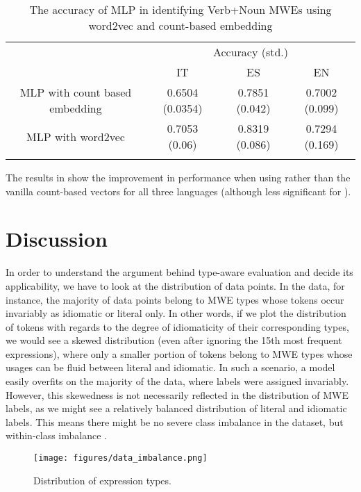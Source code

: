 \documentclass[output=paper,modfonts,nonflat]{langsci/langscibook}
\begin{document}
\begin{table}[!ht]
\small
\caption{The accuracy of MLP in identifying Verb+Noun MWEs using word2vec and count-based embedding}
\label{tab:wv}
 \begin{tabular}{cccc}
  \lsptoprule
  & \multicolumn{3}{c}{Accuracy (std.)} \\
  & IT & ES & EN \\
  \midrule
  MLP with count based embedding & 0.6504 (0.0354) & 0.7851 (0.042)  & 0.7002 (0.099) \\
  MLP with word2vec & 0.7053 (0.06) &   0.8319 (0.086) & 0.7294 (0.169) \\
  \lspbottomrule
 \end{tabular}
\end{table}

The results in  show the improvement in performance when using  rather than the vanilla count-based vectors for all three languages (although less significant for ). 
 
\section{Discussion}

In order to understand the argument behind type-aware evaluation and decide its applicability, we have to look at the distribution of data points. In the  data, for instance, the majority of data points belong to MWE types whose tokens occur invariably as idiomatic or literal only. In other words, if we plot the distribution of tokens with regards to the degree of idiomaticity of their corresponding types, we would see a skewed distribution (even after ignoring the 15th most frequent expressions), where only a smaller portion of tokens belong to MWE types whose usages can be fluid between literal and idiomatic. In such a scenario, a model easily overfits on the majority of the data, where labels were assigned invariably. However, this skewedness is not necessarily reflected in the distribution of MWE labels, as we might see a relatively balanced distribution of literal and idiomatic labels. This means there might be no severe class imbalance in the dataset, but within-class imbalance \citep{ali2015classification}.

\begin{figure}[!htb]
\texttt{[image: figures/data\_imbalance.png]} 
\caption{Distribution of expression types.}
\label{fig:data}
\end{figure}
\end{document}
